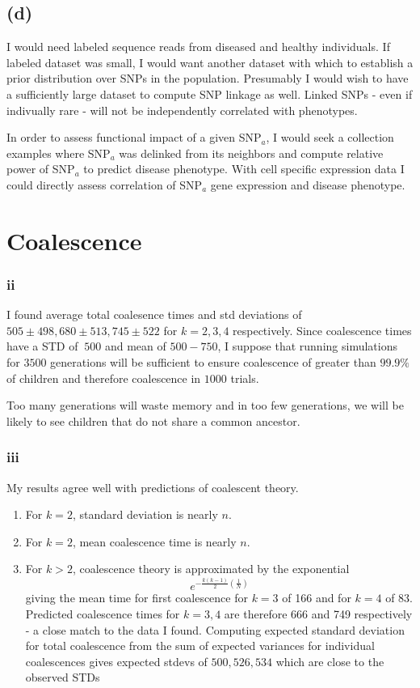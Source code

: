\documentclass[12pt,draft,a4paper]{article}
\begin{document}
\subsection*{(d)}
I would need labeled sequence reads from diseased and healthy individuals. If labeled dataset was small, I would want another dataset with which to establish a prior distribution over SNPs in the population. Presumably I would wish to have a sufficiently large dataset to compute SNP linkage as well. Linked SNPs - even if indivually rare - will not be independently correlated with phenotypes.

In order to assess functional impact of a given SNP$_a$, I would seek a collection examples where SNP$_a$ was delinked from its neighbors and compute relative power of SNP$_a$ to predict disease phenotype. With cell specific expression data I could directly assess correlation of SNP$_a$ gene expression and disease phenotype.  

\pagebreak
\section{Coalescence}
\subsubsection*{ii}
I found average total coalesence times and std deviations of $505 \pm 498, 680 \pm 513, 745 \pm 522$ for $k=2,3,4$ respectively. Since coalescence times have a STD of $~500$ and mean of $500-750$, I suppose that running simulations for $3500$ generations will be sufficient to ensure coalescence of greater than $99.9\%$ of children and therefore coalescence in $1000$ trials. 

Too many generations will waste memory and in too few generations, we will be likely to see children that do not share a common ancestor. 
\subsubsection*{iii}
My results agree well with predictions of coalescent theory.
\begin{enumerate}
\item{For $k=2$, standard deviation is nearly $n$.}
\item{For $k=2$, mean coalescence time is nearly $n$.}
\item{For $k>2$, coalescence theory is approximated by the exponential
\begin{equation}e^{-\frac{k(k-1)}{2}\left(\frac{1}{N}\right)}\end{equation}
giving the mean time for first coalescence for $k = 3$ of 166 and for $k=4$ of 83. Predicted coalescence times for $k=3,4$ are therefore 666 and 749 respectively - a close match to the data I found. Computing expected standard deviation for total coalescence from the sum of expected variances for individual coalescences gives expected stdevs of $500, 526, 534$ which are close to the observed STDs }
\end{enumerate}
\end{document}
